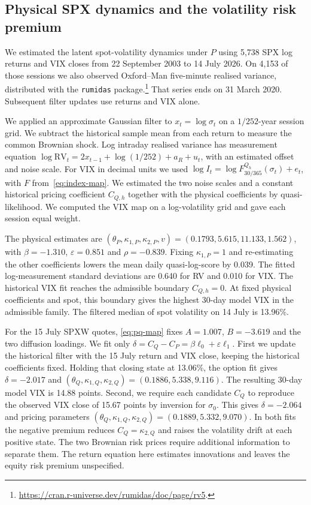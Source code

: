 \subsection{Physical SPX dynamics and the volatility risk premium}
\label{sec:spx-physical-premium}
We estimated the latent spot-volatility dynamics under $P$ using 5,738 SPX
log returns and VIX closes from 22 September 2003 to 14 July 2026.
On 4,153 of those sessions we also observed Oxford--Man five-minute realised
variance, distributed with the \texttt{rumidas} package.\footnote{\url{https://cran.r-universe.dev/rumidas/doc/page/rv5}.}
That series ends on 31 March 2020. Subsequent filter updates use returns and VIX alone.

We applied an approximate Gaussian filter to $x_t=\log\sigma_t$ on a $1/252$-year session grid.
We subtract the historical sample mean from each return to measure the common Brownian
shock. Log intraday realised variance has measurement equation
$\log \mathrm{RV}_t=2x_{t-1}+\log(1/252)+a_R+u_t$, with an estimated offset and noise scale.
For VIX in decimal units we used $\log I_t=\log F^{Q_h}_{30/365}(\sigma_t)+e_t$, with $F$
from~\eqref{eq:index-map}. We estimated the two noise scales and a constant historical
pricing coefficient $C_{Q,h}$ together with the physical coefficients by quasi-likelihood.
We computed the VIX map on a log-volatility grid and gave each session equal weight.

The physical estimates are $(\theta_P,\kappa_{1,P},\kappa_{2,P},v)=
(0.1793,5.615,11.133,1.562)$, with
$\beta=-1.310$, $\varepsilon=0.851$ and $\rho=-0.839$.
Fixing $\kappa_{1,P}=1$ and re-estimating the other coefficients lowers the mean
daily quasi-log-score by 0.039.
The fitted log-measurement standard deviations are 0.640 for RV and
0.010 for VIX. The historical VIX fit reaches the admissible boundary
$C_{Q,h}=0$. At fixed physical coefficients and spot, this boundary gives the
highest 30-day model VIX in the admissible family.
The filtered median of spot volatility on 14 July is 13.96\%.

For the 15 July SPXW quotes, \eqref{eq:pq-map} fixes $A=1.007$, $B=-3.619$
and the two diffusion loadings. We fit only $\delta=C_Q-C_P=\beta\ell_0+\varepsilon\ell_1$.
First we update the historical filter with the 15 July return and VIX close, keeping
the historical coefficients fixed. Holding that closing state at
13.06\%, the option fit gives $\delta=-2.017$
and $(\theta_Q,\kappa_{1,Q},\kappa_{2,Q})=(0.1886,
5.338,9.116)$.
The resulting 30-day model VIX is 14.88 points.
Second, we require each candidate $C_Q$ to reproduce the observed VIX close of
15.67 points by inversion for $\sigma_0$.
This gives $\delta=-2.064$ and pricing parameters
$(\theta_Q,\kappa_{1,Q},\kappa_{2,Q})=(0.1889,
5.332,9.070)$.
In both fits the negative premium reduces $C_Q=\kappa_{2,Q}$ and raises the volatility
drift at each positive state. The two Brownian risk prices require additional information
to separate them. The return equation here estimates innovations and leaves the
equity risk premium unspecified.

